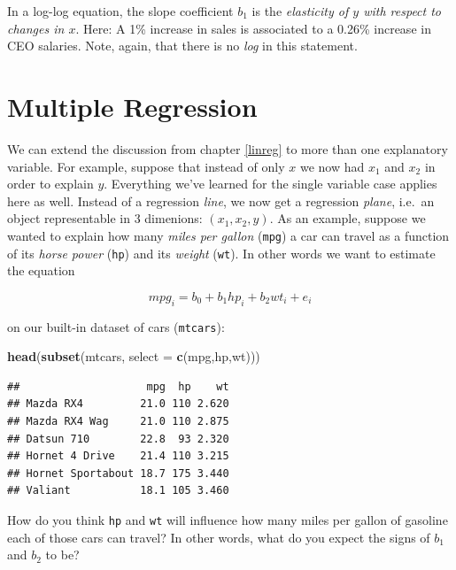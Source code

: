 \documentclass[]{book}
\newenvironment{Shaded}{\begin{snugshade}}{\end{snugshade}}
\newcommand{\KeywordTok}[1]{\textcolor[rgb]{0.13,0.29,0.53}{\textbf{#1}}}
\newcommand{\DataTypeTok}[1]{\textcolor[rgb]{0.13,0.29,0.53}{#1}}
\newcommand{\NormalTok}[1]{#1}
\newenvironment{tip}{\begin{tcolorbox}[colback=green!5!white,colframe=green]}{\end{tcolorbox}}
\begin{document}
\begin{tip}
In a log-log equation, the slope coefficient \(b_1\) is the
\emph{elasticity of \(y\) with respect to changes in \(x\)}. Here: A 1\%
increase in sales is associated to a 0.26\% increase in CEO salaries.
Note, again, that there is no \emph{log} in this statement.
\end{tip}

\chapter{Multiple Regression}\label{multiple-reg}

We can extend the discussion from chapter \ref{linreg} to more than one
explanatory variable. For example, suppose that instead of only \(x\) we
now had \(x_1\) and \(x_2\) in order to explain \(y\). Everything we've
learned for the single variable case applies here as well. Instead of a
regression \emph{line}, we now get a regression \emph{plane}, i.e.~an
object representable in 3 dimenions: \((x_1,x_2,y)\). As an example,
suppose we wanted to explain how many \emph{miles per gallon}
(\texttt{mpg}) a car can travel as a function of its \emph{horse power}
(\texttt{hp}) and its \emph{weight} (\texttt{wt}). In other words we
want to estimate the equation

\begin{equation}
mpg_i = b_0 + b_1 hp_i + b_2 wt_i + e_i \label{eq:abline2d}
\end{equation}

on our built-in dataset of cars (\texttt{mtcars}):

\begin{Shaded}
\begin{Highlighting}[]
\KeywordTok{head}\NormalTok{(}\KeywordTok{subset}\NormalTok{(mtcars, }\DataTypeTok{select =} \KeywordTok{c}\NormalTok{(mpg,hp,wt)))}
\end{Highlighting}
\end{Shaded}

\begin{verbatim}
##                    mpg  hp    wt
## Mazda RX4         21.0 110 2.620
## Mazda RX4 Wag     21.0 110 2.875
## Datsun 710        22.8  93 2.320
## Hornet 4 Drive    21.4 110 3.215
## Hornet Sportabout 18.7 175 3.440
## Valiant           18.1 105 3.460
\end{verbatim}

How do you think \texttt{hp} and \texttt{wt} will influence how many
miles per gallon of gasoline each of those cars can travel? In other
words, what do you expect the signs of \(b_1\) and \(b_2\) to be?
\end{document}
